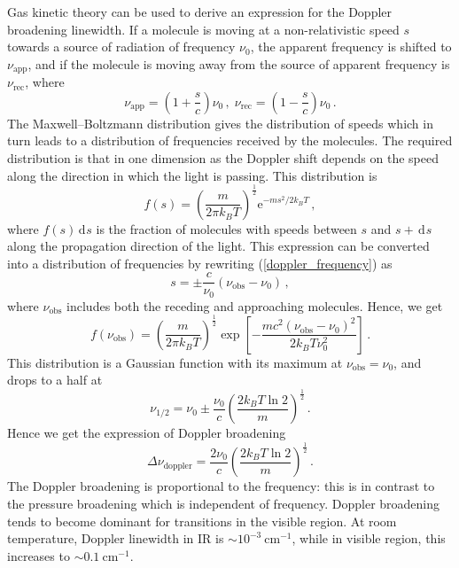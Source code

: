 \documentclass{article}
\theoremstyle{plain}\theoremheaderfont{\normalfont\itshape}\theorembodyfont{\rmfamily}\theoremseparator{.}\newtheorem*{rem}{Remark}\newtheorem*{ex}{Example}\newtheorem*{proof}{Proof}\newtheorem*{altp}{Alternative proof}
\theoremstyle{plain}\theoremheaderfont{\normalfont\bfseries}\theorembodyfont{\rmfamily}\theoremseparator{.}\newtheorem{thm}{Theorem}[section]\newtheorem{lem}[thm]{Lemma}\newtheorem{prop}[thm]{Proposition}\newtheorem*{cor}{Corollary}\newtheorem{defn}[thm]{Definition}\newtheorem{clm}[thm]{Claim}\newtheorem{clminproof}{Claim}\newtheorem{pos}{Postulate}[section]
\theoremstyle{break}\theoremheaderfont{\normalfont\itshape}\theorembodyfont{\rmfamily}\theoremseparator{.\medskip}\newtheorem*{proofskip}{Proof}\newtheorem*{exs}{Examples}\newtheorem*{rems}{Remarks}
\theoremstyle{break}\theoremheaderfont{\normalfont\bfseries}\theorembodyfont{\rmfamily}\theoremseparator{.\medskip}\newtheorem{lemskip}[thm]{Lemma}\newtheorem{defnskip}[thm]{Definition}\newtheorem{propskip}[thm]{Proposition}\newtheorem{thmskip}[thm]{Theorem}
\numberwithin{equation}{section}
\newcommand{\unit}[1]{\ \mathrm{#1}}
\newcommand{\ee}{\mathrm{e}}
\renewcommand{\d}[2][]{\,\mathrm{d}^{#1} #2}
\begin{document}
    Gas kinetic theory can be used to derive an expression for the Doppler broadening linewidth. If a molecule is moving at a non-relativistic speed \(s\) towards a source of radiation of frequency \(\nu_0\), the apparent frequency is shifted to \(\nu_{\text{app}}\), and if the molecule is moving away from the source of apparent frequency is \(\nu_{\text{rec}}\), where
    \begin{equation}\label{doppler_frequency}
        \nu_{\text{app}}=\left(1+\frac{s}{c}\right)\nu_0\,,\; \nu_{\text{rec}}=\left(1-\frac{s}{c}\right)\nu_0\,.
    \end{equation}
    The Maxwell--Boltzmann distribution gives the distribution of speeds which in turn leads to a distribution of frequencies received by the molecules. The required distribution is that in one dimension as the Doppler shift depends on the speed along the direction in which the light is passing. This distribution is
    \begin{equation}
        f(s)=\left(\frac{m}{2\pi k_B T}\right)^{\frac{1}{2}}\ee^{-ms^2/2k_B T}\,,
    \end{equation}
    where \(f(s)\d{s}\) is the fraction of molecules with speeds between \(s\) and \(s+\d{s}\) along the propagation direction of the light. This expression can be converted into a distribution of frequencies by rewriting (\ref{doppler_frequency}) as
    \begin{equation}
        s=\pm\frac{c}{\nu_0}(\nu_{\text{obs}}-\nu_0)\,,
    \end{equation}
    where \(\nu_{\text{obs}}\) includes both the receding and approaching molecules. Hence, we get
    \begin{equation}
        f(\nu_{\text{obs}})=\left(\frac{m}{2\pi k_B T}\right)^{\frac{1}{2}}\exp\left[-\frac{mc^2(\nu_{\text{obs}}-\nu_0)^2}{2k_B T\nu_0^2}\right]\,.
    \end{equation}
    This distribution is a Gaussian function with its maximum at \(\nu_{\text{obs}}=\nu_0\), and drops to a half at
    \begin{equation}
        \nu_{1/2}=\nu_0\pm\frac{\nu_0}{c}\left(\frac{2k_B T\ln 2}{m}\right)^{\frac{1}{2}}\,.
    \end{equation}
    Hence we get the expression of Doppler broadening
    \begin{equation}
        \Delta\nu_{\text{doppler}}=\frac{2\nu_0}{c}\left(\frac{2k_B T\ln 2}{m}\right)^{\frac{1}{2}}\,.
    \end{equation}
    The Doppler broadening is proportional to the frequency: this is in contrast to the pressure broadening which is independent of frequency. Doppler broadening tends to become dominant for transitions in the visible region. At room temperature, Doppler linewidth in IR is \(\sim 10^{-3}\unit{cm}^{-1}\), while in visible region, this increases to \(\sim 0.1\unit{cm}^{-1}\).
\end{document}
